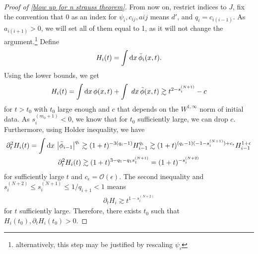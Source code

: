 \documentclass[11pt, oneside]{amsart}
\begin{document}
\begin{proof}[Proof of \cref{blow up for n strauss theorem}]
		From now on, restrict indices to $J$, fix the convention that $0$ as an index for $\psi_i,c_{ij},a{ij}$ means $d'$, and $q_i=c_{i(i-1)}$. As $a_{i(i+1)}>0$, we will set all of them equal to 1, as it will not change the argument.\footnote{alternatively, this step may be justified by rescaling $\psi_i$} Define
		\begin{equation*}
			\begin{gathered}
				H_i(t)=\int \mathrm{d} x\, \bar{\phi}_i(x,t).		
			\end{gathered}
		\end{equation*}
		Using the lower bounds, we get 
		\begin{equation*}
			\begin{gathered}
				H_i(t)=\int \mathrm{d} x \, \phi(x,t)+\int\ d x\, \tilde{\phi}(x,t)\gtrsim t^{2-s_i^{(N+1)}}-c
			\end{gathered}
		\end{equation*}
		for $t>t_0$ with $t_0$ large enough and $c$ that depends on the $W^{1,\infty}$ norm of initial data. As $s_i^{(m_0+1)}<0$, we know that for $t_0$ sufficiently large, we can drop $c$. Furthermore, using Holder inequality, we have
		\begin{equation}\label{n H bound}
			\begin{gathered}
				\partial_t^2 H_i(t)=\int\mathrm{d} x\, \left\lvert \bar{\phi}_{i-1}\right\rvert^{q_i}\gtrsim (1+t)^{-3(q_i-1)}H_{i-1}^{q_i}\gtrsim (1+t)^{(q_i-1)(-1-s_i^{(N+1)})+c_\epsilon}H_{i-1}^{1+\epsilon}\\
				\partial_t^2H_i(t)\gtrsim (1+t)^{3-q_1-q_1s_1^{(N+1)}}=(1+t)^{-s_i^{(N+2)}}
			\end{gathered}
		\end{equation}
		for sufficiently large $t$ and $c_\epsilon=\mathcal{O}(\epsilon)$. The second inequality and $s_i^{(N+2)}\leq s_i^{(N+1)}\leq1/q_{i+1}<1$ means
		\begin{equation*}
			\begin{gathered}
				\partial_tH_i\gtrsim t^{1-s_i^{(N+2)}}
			\end{gathered}
		\end{equation*}
		for $t$ sufficiently large. Therefore, there exists $t_0$ such that $H_i(t_0),\partial_tH_i(t_0)>0$.
		

\end{proof}
\end{document}
